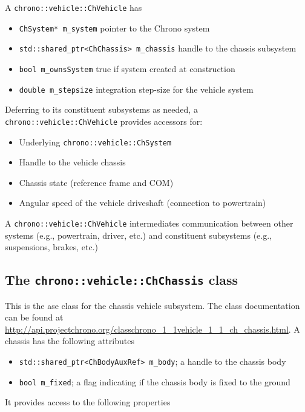 A \lstinline{chrono::vehicle::ChVehicle} has

\begin{itemize}
\item \lstinline{ChSystem* m_system} pointer to the Chrono system
\item \lstinline{std::shared_ptr<ChChassis> m_chassis} handle to the chassis subsystem
\item \lstinline{bool m_ownsSystem} true if system created at construction
\item \lstinline{double m_stepsize}  integration step-size for the vehicle system
\end{itemize}

Deferring to its constituent subsystems as needed, a \lstinline{chrono::vehicle::ChVehicle} provides accessors for:

\begin{itemize}
\item Underlying \lstinline{chrono::vehicle::ChSystem}
\item Handle to the vehicle chassis
\item Chassis state (reference frame and COM)
\item Angular speed of the vehicle driveshaft (connection to powertrain)
\end{itemize}

A \lstinline{chrono::vehicle::ChVehicle} intermediates communication between other systems (e.g.,
powertrain, driver, etc.) and constituent subsystems (e.g., suspensions, brakes, etc.)

\subsection{ The \lstinline{chrono::vehicle::ChChassis} class}

This is the ase class for the chassis vehicle subsystem. The class documentation can be found at 
\url{http://api.projectchrono.org/classchrono_1_1vehicle_1_1_ch_chassis.html}. A chassis has the following attributes

\begin{itemize}
\item \lstinline{std::shared_ptr<ChBodyAuxRef> m_body}; a handle to the chassis body
\item \lstinline{bool m_fixed}; a flag indicating if the chassis body is fixed to the ground
\end{itemize}

It provides access to the following properties

